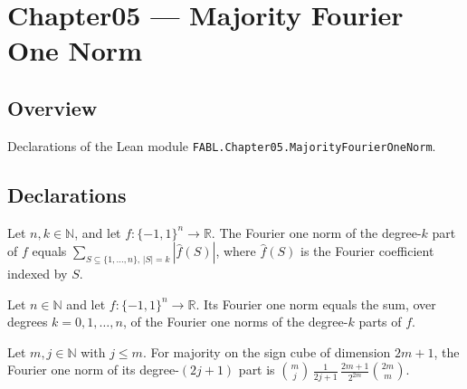 \chapter{Chapter05 — Majority Fourier One Norm}
\section{Overview}

Declarations of the Lean module \texttt{FABL.Chapter05.MajorityFourierOneNorm}.

\section{Declarations}

\begin{theorem}
\label{FABL.fourierOneNorm_degreePart_eq_sum_level}
\leanok
{}
Let $n,k\in\mathbb N$, and let $f:\{-1,1\}^n\to\mathbb R$. The Fourier one norm of the
degree-$k$ part of $f$ equals $\sum_{S\subseteq\{1,\ldots,n\},\,|S|=k}|\widehat f(S)|$,
where $\widehat f(S)$ is the Fourier coefficient indexed by $S$.
\end{theorem}

\begin{theorem}
\label{FABL.fourierOneNorm_eq_sum_degreeParts}
\leanok
{}
Let $n\in\mathbb N$ and let $f:\{-1,1\}^n\to\mathbb R$. Its Fourier one norm equals the
sum, over degrees $k=0,1,\ldots,n$, of the Fourier one norms of the degree-$k$ parts of
$f$.
\end{theorem}

\begin{theorem}
\label{FABL.fourierOneNorm_degreePart_majority_odd}
\leanok
{}
Let $m,j\in\mathbb N$ with $j\le m$. For majority on the sign cube of dimension $2m+1$,
the Fourier one norm of its degree-$(2j+1)$ part is
$\binom{m}{j}\,\frac{1}{2j+1}\,\frac{2m+1}{2^{2m}}\binom{2m}{m}$.
\end{theorem}

